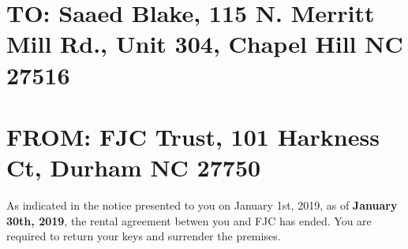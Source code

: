 \documentclass[11pt]{article}
\author{emsenn}
\date{\today}
\title{}
\begin{document}
\section*{TO: Saaed Blake, 115 N. Merritt Mill Rd., Unit 304, Chapel Hill NC 27516}
\label{sec:orgf0ba2d9}
\section*{FROM: FJC Trust, 101 Harkness Ct, Durham NC 27750}
\label{sec:orgd933b20}
As indicated in the notice presented to you on January 1st, 2019, as
of \textbf{January 30th, 2019}, the rental agreement betwen you and FJC has
ended. You are required to return your keys and surrender the premises.
\end{document}
